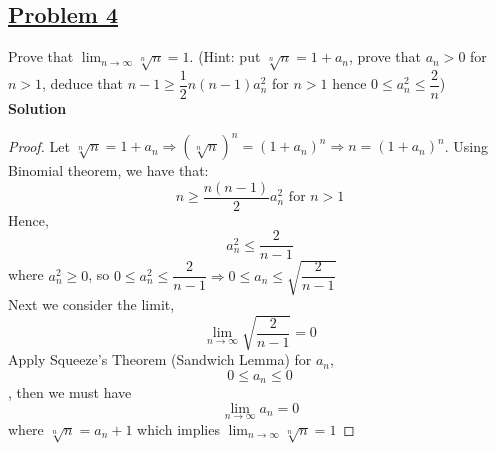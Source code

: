 \documentclass[10pt,letterpaper]{article}
\newcommand{\sol}{\textbf{Solution}}
\begin{document}
	\subsection*{{\color{red}\underline{Problem 4}}}
	Prove that $\displaystyle\lim_{n\to \infty} \sqrt[n]{n} = 1$. (Hint: put $\sqrt[n]{n} = 1 + a_n$, prove that
	$a_n > 0$ for $n > 1$, deduce that $n - 1 \geq \dfrac{1}{2}n(n - 1)a_n^2$ for $n > 1$ hence $0 \leq a_n^2 \leq \dfrac{2}{n}$)\\
	\sol
	\begin{proof}
	Let $\sqrt[n]{n} = 1 + a_n \Rightarrow (\sqrt[n]{n})^n = (1 + a_n)^n \Rightarrow n = (1 + a_n)^n$. Using Binomial theorem,
	we have that:
	$$n \geq \dfrac{n(n - 1)}{2}a_n^2 \text{ for } n > 1$$
	Hence,
	$$a_n^2 \leq \dfrac{2}{n - 1}$$ 
	where $a_n^2 \geq 0$, so $0 \leq a_n^2 \leq \dfrac{2}{n - 1} \Rightarrow 0 \leq a_n \leq \sqrt{\dfrac{2}{n-1}}$\\ 
	Next we consider the limit,
	$$\displaystyle\lim_{n\to \infty}  \sqrt{\dfrac{2}{n-1}} = 0$$
	Apply Squeeze's Theorem (Sandwich Lemma) for $a_n$, $$0 \leq a_n \leq 0$$, then we must have
	$$\displaystyle\lim_{n\to \infty}  a_n = 0$$
	where $\sqrt[n]{n} = a_n + 1$ which implies $\displaystyle\lim_{n\to \infty} \sqrt[n]{n} = 1$
	\end{proof}
	
\end{document}

